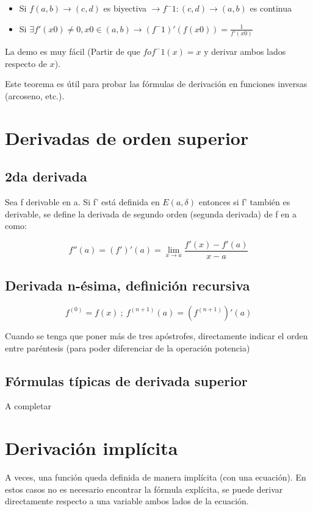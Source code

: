\documentclass{report}
\begin{document}
		\begin{itemize}
			\item Si $f(a,b)\rightarrow(c,d)$ es biyectiva $\rightarrow f^-1:(c,d)\rightarrow(a,b)$ es continua
			\item Si $\exists f'(x0) \neq 0, x0 \in(a,b) \rightarrow (f^-1)'(f(x0))=\frac{1}{f'(x0)}$
				
		\end{itemize}
	
		La demo es muy fácil (Partir de que $fof^-1(x)=x$ y derivar ambos lados respecto de $x$).
		
		Este teorema es útil para probar las fórmulas de derivación en funciones inversas (arcoseno, etc.).
		
	\section{Derivadas de orden superior}
		\subsection{2da derivada}
			Sea f derivable en a. Si f' está definida en $E(a, \delta)$ entonces si f' también es derivable, se define la derivada de segundo orden (segunda derivada) de f en a como:
			
			$$f''(a) = (f')'(a) = \lim_{x \to a}\frac{f'(x)-f'(a)}{x-a}$$
			
		\subsection{Derivada n-ésima, definición recursiva}
			
		$$f^(0)=f(x) \ ; \ f^{(n+1)}(a) = (f^{(n+1)})'(a)$$
		
			Cuando se tenga que poner más de tres apóstrofes, directamente indicar el orden entre paréntesis (para poder diferenciar de la operación potencia)
			
		\subsection{Fórmulas típicas de derivada superior}
		
		A completar
			
	\section{Derivación implícita}
		A veces, una función queda definida de manera implícita (con una ecuación). En estos casos no es necesario encontrar la fórmula explícita, se puede derivar directamente respecto a una variable ambos lados de la ecuación.
		
\end{document}
